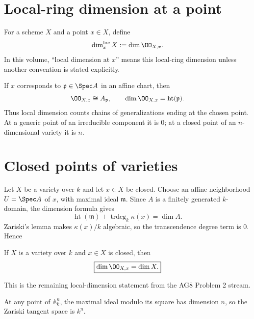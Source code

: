 \section{Local-ring dimension at a point}\label{sec:vi32-local-dimension}
\begin{definition}\label{def:vi32-local-dim}
For a scheme $X$ and a point $x\in X$, define
\[
 \dim_x^{\mathrm{loc}}X:=\dim\OO_{X,x}.
\]
In this volume, ``local dimension at $x$'' means this local-ring dimension unless another convention is stated explicitly.
\end{definition}
If $x$ corresponds to $\mathfrak p\in\Spec A$ in an affine chart, then
\[
 \OO_{X,x}\cong A_{\mathfrak p},
 \qquad
 \dim\OO_{X,x}=\operatorname{ht}(\mathfrak p).
\]
Thus local dimension counts chains of generalizations ending at the chosen point.  At a generic point of an irreducible
component it is $0$; at a closed point of an $n$-dimensional variety it is $n$.


\section{Closed points of varieties}\label{sec:vi32-closed-variety}
Let $X$ be a variety over $k$ and let $x\in X$ be closed. Choose an affine neighborhood $U=\Spec A$ of $x$, with maximal
ideal $\mathfrak m$.  Since $A$ is a finitely generated $k$-domain, the dimension formula gives
\[
 \operatorname{ht}(\mathfrak m)+\operatorname{trdeg}_k\kappa(x)=\dim A.
\]
Zariski's lemma makes $\kappa(x)/k$ algebraic, so the transcendence degree term is $0$. Hence
\begin{theorem}\label{thm:vi32-closed-variety}
If $X$ is a variety over $k$ and $x\in X$ is closed, then
\[
 \boxed{\dim\OO_{X,x}=\dim X.}
\]
\end{theorem}
This is the remaining local-dimension statement from the AG8 Problem 2 stream.


\begin{example}\label{ex:vi32-expand-01}
At any point of $\mathbb A^n_k$, the maximal ideal modulo its square has dimension $n$, so the Zariski tangent space is $k^n$.
\end{example}

